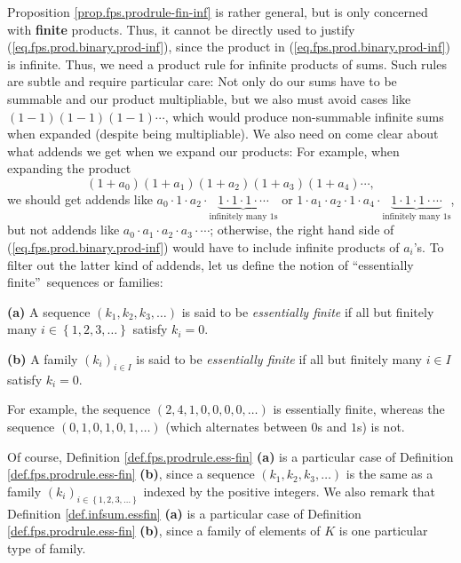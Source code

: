 Proposition \ref{prop.fps.prodrule-fin-inf} is rather general, but is only
concerned with \textbf{finite} products. Thus, it cannot be directly used to
justify (\ref{eq.fps.prod.binary.prod-inf}), since the product in
(\ref{eq.fps.prod.binary.prod-inf}) is infinite. Thus, we need a product rule
for infinite products of sums. Such rules are subtle and require particular
care: Not only do our sums have to be summable and our product multipliable,
but we also must avoid cases like $\left(  1-1\right)  \left(  1-1\right)
\left(  1-1\right)  \cdots$, which would produce non-summable infinite sums
when expanded (despite being multipliable). We also need on come clear about
what addends we get when we expand our products: For example, when expanding
the product
\[
\left(  1+a_{0}\right)  \left(  1+a_{1}\right)  \left(  1+a_{2}\right)
\left(  1+a_{3}\right)  \left(  1+a_{4}\right)  \cdots,
\]
we should get addends like $a_{0}\cdot1\cdot a_{2}\cdot\underbrace{1\cdot
1\cdot1\cdot\cdots}_{\text{infinitely many }1\text{s}}$ or $1\cdot a_{1}\cdot
a_{2}\cdot1\cdot a_{4}\cdot\underbrace{1\cdot1\cdot1\cdot\cdots}%
_{\text{infinitely many }1\text{s}}$, but not addends like $a_{0}\cdot
a_{1}\cdot a_{2}\cdot a_{3}\cdot\cdots$; otherwise, the right hand side of
(\ref{eq.fps.prod.binary.prod-inf}) would have to include infinite products of
$a_{i}$'s. To filter out the latter kind of addends, let us define the notion
of \textquotedblleft essentially finite\textquotedblright\ sequences or families:

\begin{definition}
\label{def.fps.prodrule.ess-fin}\textbf{(a)} A sequence $\left(  k_{1}%
,k_{2},k_{3},\ldots\right)  $ is said to be \emph{essentially finite} if all
but finitely many $i\in\left\{  1,2,3,\ldots\right\}  $ satisfy $k_{i}=0$.
\medskip

\textbf{(b)} A family $\left(  k_{i}\right)  _{i\in I}$ is said to be
\emph{essentially finite} if all but finitely many $i\in I$ satisfy $k_{i}=0$.
\end{definition}

For example, the sequence $\left(  2,4,1,0,0,0,0,\ldots\right)  $ is
essentially finite, whereas the sequence $\left(  0,1,0,1,0,1,\ldots\right)  $
(which alternates between $0$s and $1$s) is not.

Of course, Definition \ref{def.fps.prodrule.ess-fin} \textbf{(a)} is a
particular case of Definition \ref{def.fps.prodrule.ess-fin} \textbf{(b)},
since a sequence $\left(  k_{1},k_{2},k_{3},\ldots\right)  $ is the same as a
family $\left(  k_{i}\right)  _{i\in\left\{  1,2,3,\ldots\right\}  }$ indexed
by the positive integers. We also remark that Definition
\ref{def.infsum.essfin} \textbf{(a)} is a particular case of Definition
\ref{def.fps.prodrule.ess-fin} \textbf{(b)}, since a family of elements of $K$
is one particular type of family.

